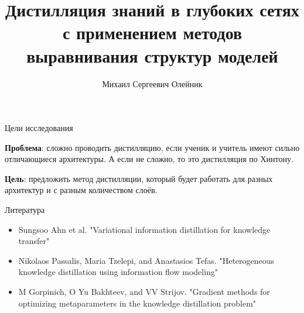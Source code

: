 \documentclass{beamer}
\title[\hbox to 56mm{Дистилляция знаний в глубоких сетях с применением методов выравнивания структур моделей}]{Дистилляция знаний в глубоких сетях с применением методов выравнивания структур моделей}
\author[М.\,С.~Олейник]{Михаил Сергеевич Олейник}
\institute{Московский физико-технический институт}
\date{\footnotesize
\par\smallskip\emph{Научный руководитель:} О. Ю. Бахтеев
\par\bigskip\small 2023}
\begin{document}

\begin{frame}

    \thispagestyle{empty}
    \maketitle

\end{frame}


\begin{frame}{Цели исследования}

    \textbf{Проблема}: сложно проводить дистилляцию, если ученик и учитель имеют сильно отличающиеся архитектуры.
    А если не сложно, то это дистилляция по Хинтону.

    \bigskip

    \textbf{Цель}: предложить метод дистилляции, который будет работать для разных архитектур и с разным количеством слоёв.

\end{frame}


\begin{frame}{Литература}
    \begin{itemize}
        \item Sungsoo Ahn et al. "Variational information distillation for knowledge transfer"
        \item Nikolaos Passalis, Maria Tzelepi, and Anastasios Tefas. "Heterogeneous knowledge distillation using
              information flow modeling"
        \item M Gorpinich, O Yu Bakhteev, and VV Strijov. "Gradient methods for optimizing metaparameters in the
              knowledge distillation problem"
    \end{itemize}
\end{frame}

\end{document}
